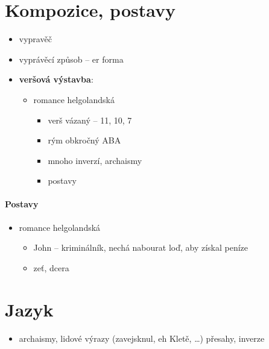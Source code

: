 \documentclass[10pt,a4paper]{article}
\begin{document}
\section*{Kompozice, postavy}
\begin{itemize}
\item vypravěč
\item vyprávěcí způsob -- er forma
\item \textbf{veršová výstavba}:	
	\begin{itemize}
	\item romance helgolandská
		\begin{itemize}
		\item verš vázaný -- 11, 10, 7
		\item rým obkročný ABA
		\item mnoho inverzí, archaismy
		\item postavy
		\end{itemize}
		
	\end{itemize}
\end{itemize}

\paragraph{Postavy}
\begin{itemize}
\item romance helgolandská
	\begin{itemize}
	\item John -- kriminálník, nechá nabourat loď, aby získal peníze
	\item zeť, dcera
	\end{itemize}
\end{itemize}

			

\section*{Jazyk}
\begin{itemize}
\item archaismy, lidové výrazy (zavejsknul, eh Kletě, …) přesahy, inverze
\end{itemize}
\end{document}
